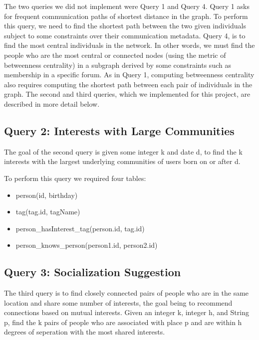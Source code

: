 \documentclass{article}
\begin{document}
\begin{multicols}{2}
The two queries we did not implement were Query 1 and Query 4. Query 1 asks for frequent communication paths of shortest distance in the graph. To perform this query, we need to find the shortest path between the two given individuals subject to some constraints over their communication metadata. Query 4, is to find the most central individuals in the network. In other words, we must find the people who are the most central or connected nodes (using the metric of betweenness centrality) in a subgraph derived by some constraints such as membership in a specific forum. As in Query 1, computing betweenness centrality also requires computing the shortest path between each pair of individuals in the graph. The second and third queries, which we implemented for this project, are described in more detail below.

\subsection{Query 2: Interests with Large Communities}
The goal of the second query is given some integer k and date d, to find the k interests with the largest underlying communities of users born on or after d.

To perform this query we required four tables: 
\begin{itemize}
\item person(id, birthday)
\item tag(tag.id, tagName)
\item person\_hasInterest\_tag(person.id, tag.id)
\item person\_knows\_person(person1.id, person2.id)
\end{itemize}

\subsection{Query 3: Socialization Suggestion}
The third query is to find closely connected pairs of people who are in the same location and share some number of interests, the goal being to recommend connections based on mutual interests. Given an integer k, integer h, and String p, find the k pairs of people who are associated with place p and are within h degrees of seperation with the most shared interests.


\end{multicols}
\end{document}
